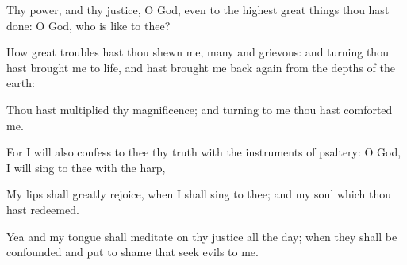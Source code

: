 \item Thy power, and thy justice, O God, even to the highest great things thou hast done: O God, who is like to thee?
\item How great troubles hast thou shewn me, many and grievous: and turning thou hast brought me to life, and hast brought me back again from the depths of the earth:
\item Thou hast multiplied thy magnificence; and turning to me thou hast comforted me.
\item For I will also confess to thee thy truth with the instruments of psaltery: O God, I will sing to thee with the harp,
\item My lips shall greatly rejoice, when I shall sing to thee; and my soul which thou hast redeemed. 
\item Yea and my tongue shall meditate on thy justice all the day; when they shall be confounded and put to shame that seek evils to me.